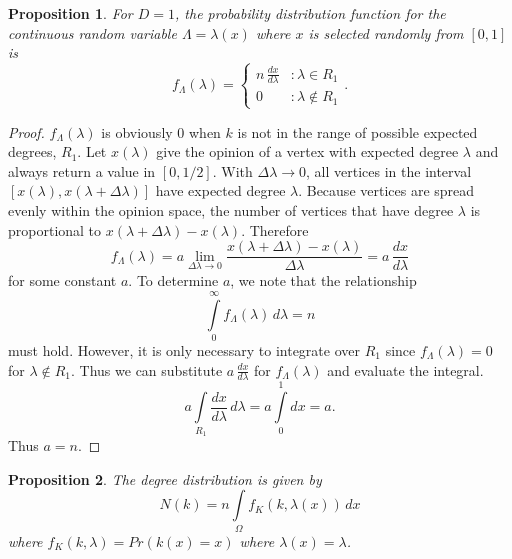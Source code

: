 \documentclass[a4paper,10pt]{article}
\newtheorem{prop}{Proposition}
\begin{document}
\begin{prop}
 For $D=1$, the probability distribution function for the continuous random variable $\Lambda = \lambda(x)$ where $x$ is selected randomly from $[0, 1]$ is
 \begin{equation}
 f_\Lambda(\lambda) = \left\{
     \begin{array}{lr}
  n \,\frac{dx}{d\lambda} & : \lambda \in R_1 \\
  0 & : \lambda \notin R_1
     \end{array}
   \right..
\end{equation}
\end{prop}
\begin{proof}
$f_\Lambda(\lambda)$ is obviously 0 when $k$ is not in the range of possible expected degrees, $R_1$. Let $x(\lambda)$ give the opinion of a vertex with expected degree $\lambda$ and always return a value in $[0, 1/2]$. With $\Delta \lambda \to 0$, all vertices in the interval $[x(\lambda), x(\lambda + \Delta \lambda)]$ have expected degree $\lambda$. Because vertices are spread evenly within the opinion space, the number of vertices that have degree $\lambda$ is proportional to $x(\lambda + \Delta \lambda) - x(\lambda)$. Therefore
\begin{equation}
 f_\Lambda(\lambda) = a \lim\limits_{\Delta \lambda \to 0} \frac{x(\lambda + \Delta \lambda) - x(\lambda)}{\Delta \lambda} = a \, \frac{dx}{d\lambda}
\end{equation}
for some constant $a$. To determine $a$, we note that the relationship 
\begin{equation}
 \int\limits_{0}^\infty f_\Lambda(\lambda)\, d\lambda = n
\end{equation}
must hold. However, it is only necessary to integrate over $R_1$ since $f_\Lambda(\lambda) = 0$ for $\lambda \notin R_1$. Thus we can substitute $a \, \frac{dx}{d\lambda}$ for $f_\Lambda(\lambda)$ and evaluate the integral.
\begin{equation}
 a\int\limits_{R_1} \frac{dx}{d\lambda} \, d\lambda = a\int\limits_{0}^1 dx = a.
\end{equation}
Thus $a = n$.
\end{proof}

\begin{prop}
 The degree distribution is given by
 \begin{equation}
  N(k) = n \int\limits_\Omega f_K(k, \lambda(x))\, dx
 \end{equation}
 where $f_K(k, \lambda) = Pr(k(x) = x)$ where $\lambda(x) = \lambda$. 
\end{prop}
\end{document}
